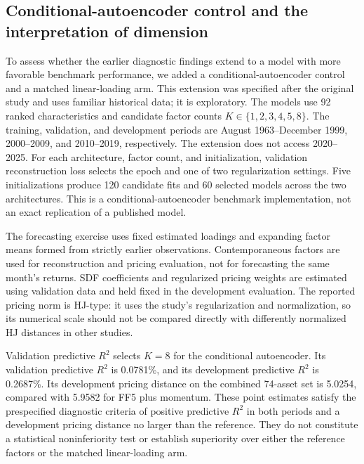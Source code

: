 \subsection{Conditional-autoencoder control and the interpretation of dimension}
\label{sec:cae-control}

To assess whether the earlier diagnostic findings extend to a model with more
favorable benchmark performance, we added a conditional-autoencoder control and
a matched linear-loading arm. This extension was specified after the original
study and uses familiar historical data; it is exploratory. The models use 92
ranked characteristics and candidate factor counts $K\in\{1,2,3,4,5,8\}$.
The training, validation, and development periods are August 1963--December 1999,
2000--2009, and 2010--2019, respectively. The extension does not access 2020--2025.
For each architecture, factor count, and initialization, validation reconstruction
loss selects the epoch and one of two regularization settings. Five initializations
produce 120 candidate fits and 60 selected models across the two architectures.
This is a conditional-autoencoder benchmark implementation, not an exact
replication of a published model.

The forecasting exercise uses fixed estimated loadings and expanding factor means
formed from strictly earlier observations. Contemporaneous factors are used for
reconstruction and pricing evaluation, not for forecasting the same month's
returns. SDF coefficients and regularized pricing weights are estimated using
validation data and held fixed in the development evaluation. The reported
pricing norm is HJ-type: it uses the study's regularization and normalization,
so its numerical scale should not be compared directly with differently
normalized HJ distances in other studies.

Validation predictive $R^2$ selects $K=8$ for the conditional autoencoder. Its
validation predictive $R^2$ is 0.0781\%, and its development predictive $R^2$ is
0.2687\%. Its development pricing distance on the combined 74-asset set is
5.0254, compared with 5.9582 for FF5 plus momentum. These point estimates satisfy
the prespecified diagnostic criteria of positive predictive $R^2$ in both periods
and a development pricing distance no larger than the reference. They do not
constitute a statistical noninferiority test or establish superiority over either
the reference factors or the matched linear-loading arm.

